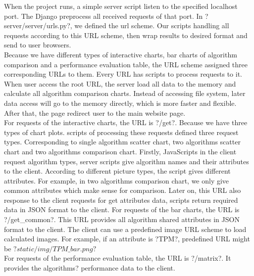 \documentclass[11pt,letter]{article}
\begin{document}
When the project runs, a simple server script listen to the specified localhost port. The Django preprocess all received requests of that port. In ?server/server/urls.py?, we defined the url scheme. Our scripts handling all requests according to this URL scheme, then wrap results to desired format and send to user browsers.  \\
Because we have different types of interactive charts, bar charts of algorithm comparison and a performance evaluation table, the URL scheme assigned three corresponding URLs to them. Every URL has scripts to process requests to it. \\
When user access the root URL, the server load all data to the memory and calculate all algorithm comparison charts. Instead of accessing file system, later data access will go to the memory directly, which is more faster and flexible. After that, the page redirect user to the main website page. \\
For requests of the interactive charts, the URL is ?/get?. Because we have three types of chart plots. scripts of processing these requests defined three request types. Corresponding to single algorithm scatter chart, two algorithms scatter chart and two algorithms comparison chart. Firstly, JavaScripts in the client request algorithm types, server scripts give algorithm names and their attributes to the client. According to different picture types, the script gives different attributes. For example, in two algorithms comparison chart, we only give common attributes which make sense for comparison. Later on, this URL also response to the client requests for get attributes data, scripts return required data in JSON format to the client.
For requests of the bar charts, the URL is ?/get\_common?. This URL provides all algorithm shared attributes in JSON format to the client. The client can use a predefined image URL scheme to load calculated images. For example, if an attribute is ?TPM?, predefined URL might be $?static/img/TPM\_bar.png?$ \\
For requests of the performance evaluation table, the URL is ?/matrix?. It provides the algorithms? performance data to the client. \\
\end{document}
